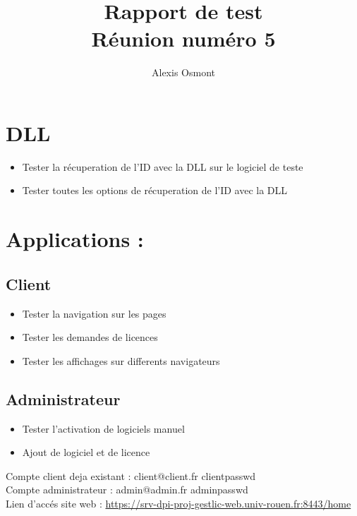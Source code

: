 \documentclass{article}
\title{
    \Huge
    Rapport de test\\
    Réunion numéro 5\\
}
\author{\huge Alexis Osmont\\}
\begin{document}
\maketitle
\vspace{5cm}
\newpage

\section{DLL}   

\begin{itemize}
  \item Tester la récuperation de l'ID avec la DLL sur le logiciel de teste
  \item Tester toutes les options de récuperation de l'ID avec la DLL
\end{itemize}

\section{Applications :}
\subsection{Client}

\begin{itemize}
  \item Tester la navigation sur les pages
  \item Tester les demandes de licences
  \item Tester les affichages sur differents navigateurs
\end{itemize}

\subsection{Administrateur}

\begin{itemize}
  \item Tester l'activation de logiciels manuel
  \item Ajout de logiciel et de licence\newline
\end{itemize}
Compte client deja existant : client@client.fr clientpasswd\\
Compte administrateur : admin@admin.fr adminpasswd\\

Lien d'accés site web : \href{https://srv-dpi-proj-gestlic-web.univ-rouen.fr:8443/home}{https://srv-dpi-proj-gestlic-web.univ-rouen.fr:8443/home}
\end{document}
